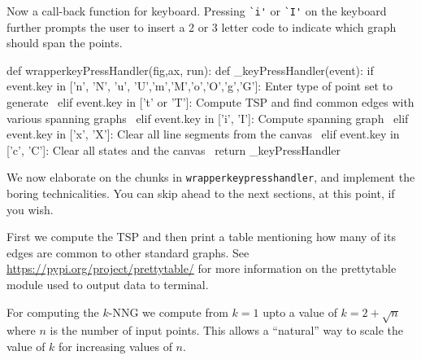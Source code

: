 Now a call-back function for keyboard. Pressing \verb|`i'| or \verb|`I'| on the keyboard further prompts the 
user to insert a 2 or 3 letter code to indicate which graph should span the points. 

\nwenddocs{}\plusendmoddef\nwstartdeflinemarkup{}\nwenddeflinemarkup
def wrapperkeyPressHandler(fig,ax, run): 
       def _keyPressHandler(event):
               if event.key in ['n', 'N', 'u', 'U','m','M','o','O','g','G']: 
                     \LA{}Enter type of point set to generate~{\nwtagstyle{}}\RA{}                   
               elif event.key in ['t' or 'T']:
                     \LA{}Compute TSP and find common edges with various spanning graphs~{\nwtagstyle{}}\RA{}
               elif event.key in ['i', 'I']:                     
                     \LA{}Compute spanning graph~{\nwtagstyle{}}\RA{}    
               elif event.key in ['x', 'X']:
                     \LA{}Clear all line segments from the canvas~{\nwtagstyle{}}\RA{}
               elif event.key in ['c', 'C']: 
                     \LA{}Clear all states and the canvas~{\nwtagstyle{}}\RA{}
       return _keyPressHandler
\nwendcode{}\nwdocspar

We now elaborate on the chunks in \verb|wrapperkeypresshandler|, and implement the boring technicalities. You 
can skip ahead to the next sections, at this point, if you wish. 

First we compute the TSP and then print a table mentioning how many of its edges are common to other
standard graphs. See \url{https://pypi.org/project/prettytable/} for more information on the 
prettytable module used to output data to terminal. 

For computing the $k$-NNG we compute from $k=1$ upto a value of $k=2+\sqrt{n}$ where $n$ is the number 
of input points. This allows a ``natural'' way to scale the value of $k$ for increasing values of $n$. 


